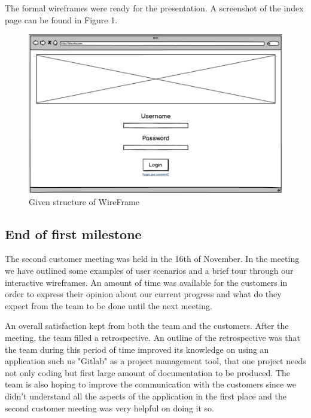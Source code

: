 \documentclass{l3proj}
\begin{document}
The formal wireframes were ready for the presentation. A screenshot of the index page can be found in Figure 1.

\begin{figure}
  \centerline{\includegraphics[width=\textwidth, height=\textheight, keepaspectratio]{wireframe.png}}
  \caption{Given structure of WireFrame}
  \label{fig:initialWireframe}
\end{figure}



\subsection{End of first milestone}
\label{sec:milestone1}

The second customer meeting was held in the 16th of November. In the meeting we have outlined some examples of user scenarios and a brief tour through our interactive wireframes. An amount of time was available for the customers in order to express their opinion about our current progress and what do they expect from the team to be done until the next meeting.

An overall satisfaction kept from both the team and the customers. After the meeting, the team filled a retrospective. An outline of the retrospective was that the team during this period of time improved its knowledge on using an application such us "Gitlab" as a project management tool, that one project needs not only coding but first large amount of documentation to be produced. The team is also hoping to improve the communication with the customers since we didn't understand all the aspects of the application in the first place and the second customer meeting was very helpful on doing it so.
\end{document}

